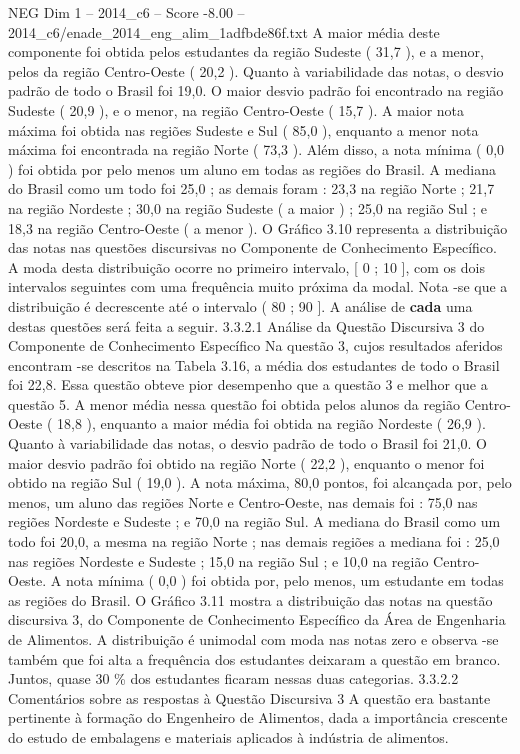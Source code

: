 \begin{textsample}{NEG Dim 1 – 2014\_c6 – Score -8.00 – 2014\_c6/enade\_2014\_eng\_alim\_1adfbde86f.txt}
A maior média deste componente foi obtida pelos estudantes da região Sudeste ( 31,7 ), e a menor, pelos da região Centro-Oeste ( 20,2 ).
Quanto à variabilidade das notas, o desvio padrão de todo o Brasil foi 19,0.
O maior desvio padrão foi encontrado na região Sudeste ( 20,9 ), e o menor, na região Centro-Oeste ( 15,7 ).
A maior nota máxima foi obtida nas regiões Sudeste e Sul ( 85,0 ), enquanto a menor nota máxima foi encontrada na região Norte ( 73,3 ).
Além disso, a nota mínima ( 0,0 ) foi obtida por pelo menos um aluno em todas as regiões do Brasil.
A mediana do Brasil como um todo foi 25,0 ; as demais foram : 23,3 na região Norte ; 21,7 na região Nordeste ; 30,0 na região Sudeste ( a maior ) ; 25,0 na região Sul ; e 18,3 na região Centro-Oeste ( a menor ).
O Gráfico 3.10 representa a distribuição das notas nas questões discursivas no Componente de Conhecimento Específico.
A moda desta distribuição ocorre no primeiro intervalo, [ 0 ; 10 ], com os dois intervalos seguintes com uma frequência muito próxima da modal.
Nota -se que a distribuição é decrescente até o intervalo ( 80 ; 90 ].
A análise de \textbf{cada} uma destas questões será feita a seguir. 3.3.2.1 Análise da Questão Discursiva 3 do Componente de Conhecimento Específico Na questão 3, cujos resultados aferidos encontram -se descritos na Tabela 3.16, a média dos estudantes de todo o Brasil foi 22,8.
Essa questão obteve pior desempenho que a questão 3 e melhor que a questão 5.
A menor média nessa questão foi obtida pelos alunos da região Centro-Oeste ( 18,8 ), enquanto a maior média foi obtida na região Nordeste ( 26,9 ).
Quanto à variabilidade das notas, o desvio padrão de todo o Brasil foi 21,0.
O maior desvio padrão foi obtido na região Norte ( 22,2 ), enquanto o menor foi obtido na região Sul ( 19,0 ).
A nota máxima, 80,0 pontos, foi alcançada por, pelo menos, um aluno das regiões Norte e Centro-Oeste, nas demais foi : 75,0 nas regiões Nordeste e Sudeste ; e 70,0 na região Sul.
A mediana do Brasil como um todo foi 20,0, a mesma na região Norte ; nas demais regiões a mediana foi : 25,0 nas regiões Nordeste e Sudeste ; 15,0 na região Sul ; e 10,0 na região Centro-Oeste.
A nota mínima ( 0,0 ) foi obtida por, pelo menos, um estudante em todas as regiões do Brasil.
O Gráfico 3.11 mostra a distribuição das notas na questão discursiva 3, do Componente de Conhecimento Específico da Área de Engenharia de Alimentos.
A distribuição é unimodal com moda nas notas zero e observa -se também que foi alta a frequência dos estudantes deixaram a questão em branco.
Juntos, quase 30 \% dos estudantes ficaram nessas duas categorias. 3.3.2.2 Comentários sobre as respostas à Questão Discursiva 3 A questão era bastante pertinente à formação do Engenheiro de Alimentos, dada a importância crescente do estudo de embalagens e materiais aplicados à indústria de alimentos.

\end{textsample}

